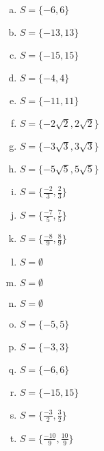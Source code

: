 \begin{resp}
\begin{multicols}{3}
\begin{enumerate}[a)]
\item $S= \{-6, 6 \}$
\item $S= \{ -13, 13\}$
\item $S= \{ -15, 15 \}$
\item $S= \{ -4, 4 \}$
\item $S= \{-11, 11 \}$
\item $S= \{-2\sqrt{2}, 2\sqrt{2} \}$
\item $S= \{-3\sqrt{3}, 3\sqrt{3} \}$
\item $S= \{ -5\sqrt{5}, 5\sqrt{5} \}$
\item $S= \{\frac{-2}{3}, \frac{2}{3} \}$
\item $S= \{\frac{-7}{5}, \frac{7}{5} \}$
\item $S= \{\frac{-8}{9}, \frac{8}{9} \}$
\item $S= \emptyset $
\item $S= \emptyset $
\item $S= \emptyset $
\item $S= \{ -5, 5 \} $
\item $S= \{ -3, 3 \} $
\item $S= \{ -6, 6 \} $
\item $S= \{ -15, 15 \} $
\item $S= \{ \frac{-3}{2}, \frac{3}{2}  \} $
\item $S= \{ \frac{-10}{9}, \frac{10}{9} \} $
\end{enumerate}
\end{multicols}
\end{resp}

